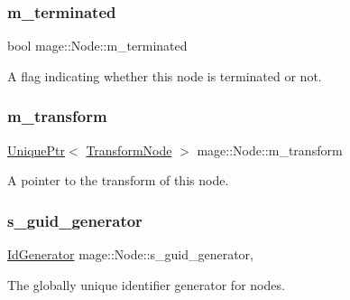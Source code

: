 \subsubsection{\texorpdfstring{m\+\_\+terminated}{m\_terminated}}
{\footnotesize\ttfamily bool mage\+::\+Node\+::m\+\_\+terminated\hspace{0.3cm}{\ttfamily [private]}}

A flag indicating whether this node is terminated or not. \hypertarget{classmage_1_1_node_a24512023f5f6ec7adad9810e55ec2ab5}{}\label{classmage_1_1_node_a24512023f5f6ec7adad9810e55ec2ab5} 
\subsubsection{\texorpdfstring{m\+\_\+transform}{m\_transform}}
{\footnotesize\ttfamily \hyperlink{namespacemage_a3316d7143a973e37adf1110f2e80ca31}{Unique\+Ptr}$<$ \hyperlink{classmage_1_1_transform_node}{Transform\+Node} $>$ mage\+::\+Node\+::m\+\_\+transform\hspace{0.3cm}{\ttfamily [private]}}

A pointer to the transform of this node. \hypertarget{classmage_1_1_node_a923a4e005420dd08eacc94fed50ac2fb}{}\label{classmage_1_1_node_a923a4e005420dd08eacc94fed50ac2fb} 
\subsubsection{\texorpdfstring{s\+\_\+guid\+\_\+generator}{s\_guid\_generator}}
{\footnotesize\ttfamily \hyperlink{classmage_1_1_id_generator}{Id\+Generator} mage\+::\+Node\+::s\+\_\+guid\+\_\+generator\hspace{0.3cm}{\ttfamily [static]}, {\ttfamily [private]}}

The globally unique identifier generator for nodes. 